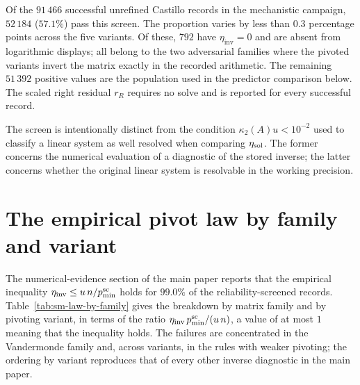 \documentclass[supplement,review,onefignum,onetabnum]{siamart251216}
\begin{document}
Of the $91\,466$ successful unrefined Castillo records in the mechanistic campaign, $52\,184$
($57.1\%$) pass this screen. The proportion varies by less than $0.3$ percentage points across the
five variants. Of these, $792$ have $\eta_{\mathrm{inv}}=0$ and are absent from logarithmic
displays; all belong to the two adversarial families where the pivoted variants invert the matrix
exactly in the recorded arithmetic. The remaining $51\,392$ positive values are the population
used in the predictor comparison below. The scaled right residual $r_R$ requires no solve and is
reported for every successful record.

The screen is intentionally distinct from the condition
$\kappa_2(A)u<10^{-2}$ used to classify a linear system as well resolved when comparing
$\eta_{\rm sol}$. The former concerns the numerical evaluation of a diagnostic of the stored
inverse; the latter concerns whether the original linear system is resolvable in the working
precision.

\section{The empirical pivot law by family and variant}
\label{sm:law}

The numerical-evidence section of the main paper reports that the empirical inequality
$\eta_{\mathrm{inv}}\le u\,n/p^{\rm sc}_{\min}$ holds for $99.0\%$ of the
reliability-screened records. Table~\ref{tab:sm-law-by-family} gives the breakdown by matrix
family and by pivoting variant, in terms of the ratio
$\eta_{\mathrm{inv}}\,p^{\rm sc}_{\min}/(u\,n)$, a value of at most $1$ meaning
that the inequality holds. The failures are concentrated in the Vandermonde
family and, across variants, in the rules with weaker pivoting; the ordering by
variant reproduces that of every other inverse diagnostic in the main paper.
\end{document}
